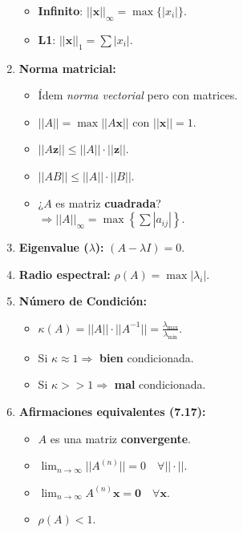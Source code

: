 \documentclass[10pt,a4paper]{article}
\begin{document}
\begin{multicols}{2}
\begin{enumerate}
\begin{itemize}
\item \textbf{Infinito}: $||\mathbf{x}||_\infty = \max \{|x_i|\}$.
\item \textbf{L1}: $||\mathbf{x}||_1 = \sum |x_i|$.
\end{itemize}
%
\item \textbf{Norma matricial:}
\begin{itemize}
\item Ídem \textit{norma vectorial} pero con matrices.
\item $||A||=\max ||A \mathbf{x}||$ con $||\mathbf{x}||=1$.
\item $||A \mathbf{z}|| \leq ||A||\cdot||\mathbf{z}||$.
\item $||AB||\leq ||A||\cdot ||B||$.
\item ¿$A$ es matriz \textbf{cuadrada}? \\$\Rightarrow ||A||_\infty = \max \left\lbrace\sum |a_{ij}|\right\rbrace$.
\end{itemize}
%
\item \textbf{Eigenvalue ($\lambda$):} $(A-\lambda I) = 0$.
%
\item \textbf{Radio espectral:} $\rho(A) = \max|\lambda_i|$.
%
\item \textbf{Número de Condición:}
\begin{itemize}
\item $\kappa (A)= ||A|| \cdot ||A^{-1}|| = \frac{\lambda_{\max}}{\lambda_{\min}}$.
\item Si $\kappa \approx 1 \Rightarrow$ \textbf{bien} condicionada.
\item Si $\kappa >> 1 \Rightarrow$ \textbf{mal} condicionada.
\end{itemize}
%
\item \textbf{Afirmaciones equivalentes (7.17):}
\begin{itemize}
\item $A$ es una matriz \textbf{convergente}.
\item $\lim_{n\rightarrow \infty} ||A^{(n)}||=0 \quad \forall ||\cdot||$.
\item $\lim_{n\rightarrow \infty} A^{(n)} \mathbf{x}=\mathbf{0} \quad \forall \mathbf{x}$.
\item $\rho(A) < 1$.
\end{itemize}
%
\end{enumerate}

\end{multicols}
\end{document}
